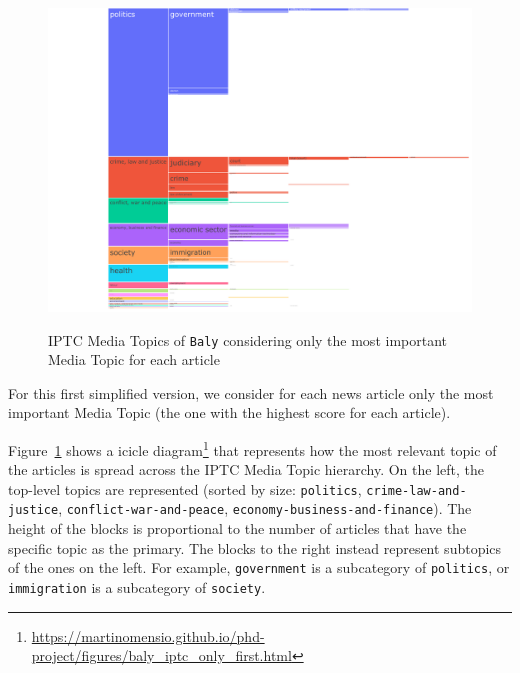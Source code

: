 \begin{figure}[!htbp]
    \centering
    \href{https://martinomensio.github.io/phd-project/figures/baly_iptc_only_first.html}{\includegraphics[trim={2.65cm 0cm 2.8cm 0cm},clip,width=\linewidth]{figures/baly_iptc_only_first.pdf}}
    \caption{IPTC Media Topics of \texttt{Baly} considering only the most important Media Topic for each article}
    \label{fig:baly_iptc_only_first}
\end{figure}

For this first simplified version, we consider for each news article only the most important Media Topic (the one with the highest score for each article).

Figure~\ref{fig:baly_iptc_only_first}
shows a icicle diagram\footnote{\url{https://martinomensio.github.io/phd-project/figures/baly_iptc_only_first.html}} that represents how the most relevant topic of the articles is spread across the IPTC Media Topic hierarchy.
On the left, the top-level topics are represented (sorted by size: \texttt{politics}, \texttt{crime-law-and-justice}, \texttt{conflict-war-and-peace}, \texttt{economy-business-and-finance}).
The height of the blocks is proportional to the number of articles that have the specific topic as the primary.
The blocks to the right instead represent subtopics of the ones on the left. For example, \texttt{government} is a subcategory of \texttt{politics}, or \texttt{immigration} is a subcategory of \texttt{society}.

